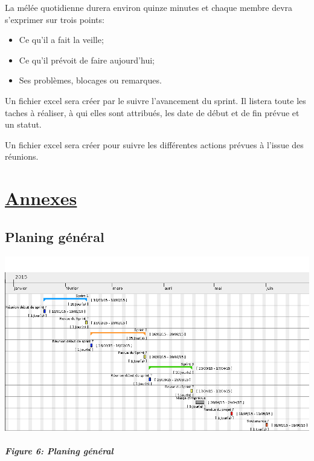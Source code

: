 \documentclass{../res/univ-projet}
\begin{document}
La mélée quotidienne durera environ quinze minutes et chaque membre devra s'exprimer sur trois points:
\begin{itemize}
 \item Ce qu'il a fait la veille;
 \item Ce qu'il prévoit de faire aujourd'hui;
 \item Ses problèmes, blocages ou remarques.
\end{itemize}


Un fichier excel sera créer par le suivre l'avancement du sprint. Il listera toute les taches à réaliser, à qui elles sont attribués, les date de début 
et de fin prévue et un statut.

Un fichier excel sera créer pour suivre les différentes actions prévues à l'issue des réunions.

\newpage
\section{\underline{Annexes}}
\subsection{Planing général}
\begin{center}
\includegraphics[angle=90,scale=0.63]{./graphics/Planing_general} \\~\\
\textbf{\textit{Figure 6: Planing général}}
\end{center}

\newpage
\end{document}
